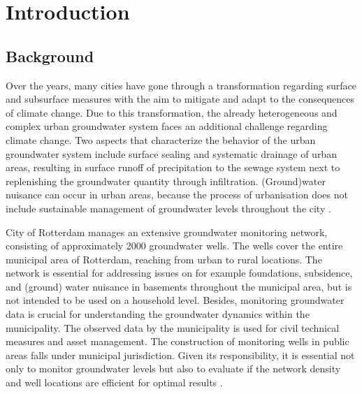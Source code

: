 \chapter{Introduction}
\label{chapter:introduction}


\section{Background}
Over the years, many cities have gone through a transformation regarding surface and subsurface measures with the aim to mitigate and adapt to the consequences of climate change. Due to this transformation, the already heterogeneous and complex urban groundwater system faces an additional challenge regarding climate change. Two aspects that characterize the behavior of the urban groundwater system include surface sealing and systematic drainage of urban areas, resulting in surface runoff of precipitation to the sewage system next to replenishing the groundwater quantity through infiltration. (Ground)water nuisance can occur in urban areas, because the process of urbanisation does not include sustainable management of groundwater levels throughout the city \cite{ven-2007}.

City of Rotterdam manages an extensive groundwater monitoring network, consisting of approximately 2000 groundwater wells. The wells cover the entire municipal area of Rotterdam, reaching from urban to rural locations. The network is essential for addressing issues on for example foundations, subsidence, and (ground) water nuisance in basements throughout the municipal area, but is not intended to be used on a household level. Besides, monitoring groundwater data is crucial for understanding the groundwater dynamics within the municipality. The observed data by the municipality is used for civil technical measures and asset management. The construction of monitoring wells in public areas falls under municipal jurisdiction. Given its responsibility, it is essential not only to monitor groundwater levels but also to evaluate if the network density and well locations are efficient for optimal results \cite{geul-2022}.


